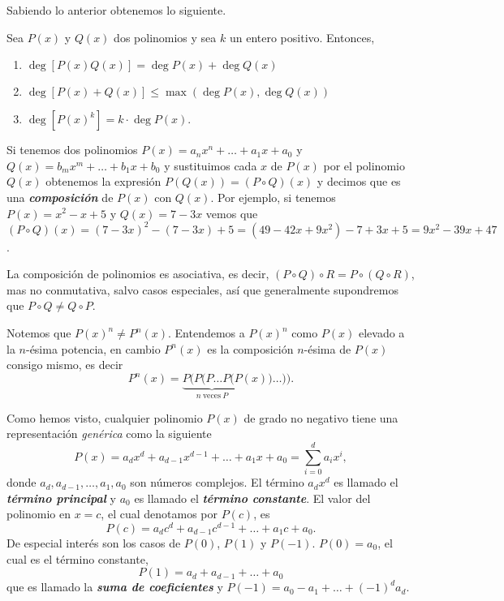 Sabiendo lo anterior obtenemos lo siguiente.
\begin{theorem.tcb}{}{}
    Sea $P(x)$ y $Q(x)$ dos polinomios y sea $k$ un entero positivo.
    Entonces,
    \begin{enumerate}
        \item $\deg [P(x) Q(x)] = \deg P(x) + \deg Q(x)$
        \item $\deg [P(x) + Q(x)] \leq \max (\deg P(x), \deg Q(x))$
        \item $\deg [P(x)^k] = k \cdot \deg P(x)$.
    \end{enumerate}
\end{theorem.tcb}

Si tenemos dos polinomios $P(x) = a_n x^n + \ldots + a_1 x + a_0$ y $Q(x) = b_m x^m + \ldots + b_1 x + b_0$ y sustituimos cada $x$ de $P(x)$ por el polinomio $Q(x)$ obtenemos la expresión $P\left(Q(x)\right) = (P \circ Q)(x)$ y decimos que es una \textbf{\emph{composición}} de $P(x)$ con $Q(x)$.
Por ejemplo, si tenemos $P(x) = x^2 - x + 5$ y $Q(x) = 7 - 3x$ vemos que $(P \circ Q)(x) = (7 - 3x)^2 - (7 - 3x) + 5 = (49 - 42x + 9x^2) - 7 + 3x + 5 = 9x^2 - 39x + 47$.

La composición de polinomios es asociativa, es decir, $(P \circ Q) \circ R = P \circ (Q \circ R)$, mas no conmutativa, salvo casos especiales, así que generalmente supondremos que $P \circ Q \neq  Q \circ P$.

\begin{remark.tcb}
    Notemos que $P(x)^n \neq P^n(x)$.
    Entendemos a $P(x)^n$ como $P(x)$ elevado a la $n$-ésima potencia, en cambio $P^n(x)$ es la composición $n$-ésima de $P(x)$ consigo mismo, es decir
    \[
        P^n(x) = \underbrace{P(P(P\dots P(P}_{n\ \text{veces}\ P} (x))\dots)).
    \]
\end{remark.tcb}


Como hemos visto, cualquier polinomio $P(x)$ de grado no negativo tiene una representación \textit{genérica} como la siguiente
\[
    P(x) = a_d x^d + a_{d - 1} x^{d - 1} + \ldots + a_1 x + a_0 = \sum_{i = 0}^{d} a_i x^i,
\]
donde $a_d, a_{d - 1}, \ldots, a_1, a_0$ son números complejos.
El término $a_d x^d$ es llamado el \textbf{\emph{término principal}} y $a_0$ es llamado el \textbf{\emph{término constante}}.
El valor del polinomio en $x = c$, el cual denotamos por $P(c)$, es
\[
    P(c) = a_d c^d + a_{d - 1}c^{d - 1} + \ldots + a_1 c + a_0.
\]
De especial interés son los casos de $P(0)$, $P(1)$ y $P(-1)$.
    $P(0) = a_0$, el cual es el término constante,
\[
    P(1) = a_d + a_{d - 1} + \ldots + a_0
\]
que es llamado la \textbf{\emph{suma de coeficientes}} y $P(-1) = a_0 - a_1 + \ldots + (-1)^d a_d.$

